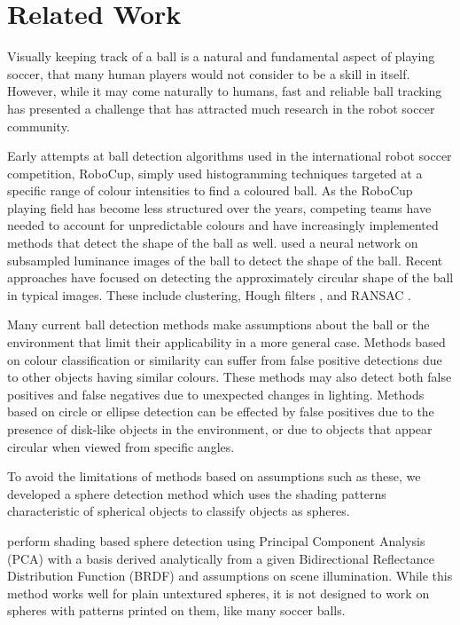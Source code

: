 \documentclass{llncs}
\begin{document}
	\section{Related Work} {
	\label{sec:related_work}

		Visually keeping track of a ball is a natural and fundamental aspect of playing soccer, that many human players would not consider to be a skill in itself. However, while it may come naturally to humans, fast and reliable ball tracking has presented a challenge that has attracted much research in the robot soccer community.

		Early attempts at ball detection algorithms used in the international robot soccer competition, RoboCup, simply used histogramming techniques targeted at a specific range of colour intensities to find a coloured ball. As the RoboCup playing field has become less structured over the years, competing teams have needed to account for unpredictable colours and have increasingly implemented methods that detect the shape of the ball as well. \citet{schulz2007ball} used a neural network on subsampled luminance images of the ball to detect the shape of the ball. Recent approaches have focused on detecting the approximately circular shape of the ball in typical images. These include clustering, Hough filters \citep{li2013survey}, and RANSAC \citep{annable2013nubots}.

		Many current ball detection methods make assumptions about the ball or the environment that limit their applicability in a more general case. Methods based on colour classification or similarity can suffer from false positive detections due to other objects having similar colours. These methods may also detect both false positives and false negatives due to unexpected changes in lighting. Methods based on circle or ellipse detection can be effected by false positives due to the presence of disk-like objects in the environment, or due to objects that appear circular when viewed from specific angles.

		To avoid the limitations of methods based on assumptions such as these, we developed a sphere detection method which uses the shading patterns characteristic of spherical objects to classify objects as spheres.

		\citet{nillius2008shading} perform shading based sphere detection using Principal Component Analysis (PCA) with a basis derived analytically from a given Bidirectional Reflectance Distribution Function (BRDF) and assumptions on scene illumination. While this method works well for plain untextured spheres, it is
		not designed to work on spheres with patterns printed on them, like many soccer balls.

}
\end{document}
